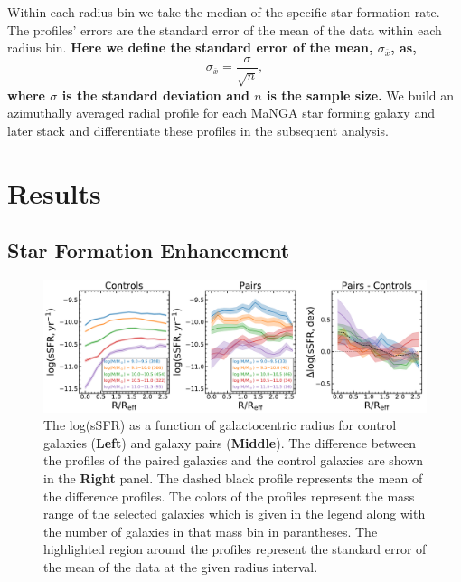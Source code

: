 \documentclass[iop,revtex4,twocolumn,apj,numberedappendix,appendixfloats]{emulateapj}
\begin{document}
Within each radius bin we take the median of the specific star formation rate. The profiles' errors are the standard error of the mean of the data within each radius bin. \textbf{Here we define the standard error of the mean, $\sigma_{\overline{x}}$, as,
\begin{equation}
\sigma_{\overline{x}} = \frac{\sigma}{\sqrt{n}},
\end{equation}
where $\sigma$ is the standard deviation and $n$ is the sample size.} We build an azimuthally averaged radial profile for each MaNGA star forming galaxy and later stack and differentiate these profiles in the subsequent analysis. 

\section{Results}\label{sec:results}

\subsection{Star Formation Enhancement}

\begin{figure}
\centering
\includegraphics[width=\linewidth]{fig/ssfr_comb.pdf}
\caption[]{The log(sSFR) as a function of galactocentric radius for control galaxies (\textbf{Left}) and galaxy pairs (\textbf{Middle}). The difference between the profiles of the paired galaxies and the control galaxies are shown in the \textbf{Right} panel. The dashed black profile represents the mean of the difference profiles. The colors of the profiles represent the mass range of the selected galaxies which is given in the legend along with the number of galaxies in that mass bin in parantheses. The highlighted region around the profiles represent the standard error of the mean of the data at the given radius interval. }
\label{fig:ssfr_prof}
\end{figure}
\end{document}
